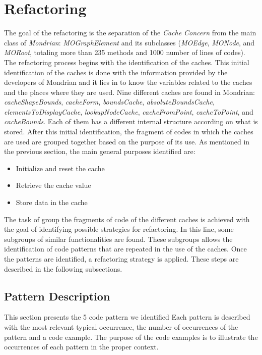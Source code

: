 \documentclass[preprint,10pt]{sigplanconf}
\newcommand{\seclabel}[1]{\label{sec:#1}}
\begin{document}
\section{Refactoring}\seclabel{refactoring}


The goal of the refactoring is the separation of the \emph{Cache
Concern} from the main class of \emph{Mondrian}: \emph{MOGraphElement}
and its subclasses (\emph{MOEdge}, \emph{MONode}, and \emph{MORoot}, totaling more than 235 methods and 1000 number of lines of codes).
The refactoring process begins with the identification of the caches.
This initial identification of the caches is done with the information
provided by the developers of Mondrian and it lies in to know the
variables related to the caches and the places where they are used.
Nine different caches are found in Mondrian: \emph{cacheShapeBounds},
\emph{cacheForm}, \emph{boundsCache}, \emph{absoluteBoundsCache},
\emph{elementsToDisplayCache}, \emph{lookupNodeCache}, \emph{cacheFromPoint},
\emph{cacheToPoint}, and \emph{cacheBounds}. Each of them has a different
internal structure according on what is stored. After this initial
identification, the fragment of codes in which the caches are used
are grouped together based on the purpose of its use. As mentioned
in the previous section, the main general purposes identified are: 
\begin{itemize}
\item Initialize and reset the cache
\item Retrieve the cache value
\item Store data in the cache
\end{itemize}
The task of group the fragments of code of the different caches is
achieved with the goal of identifying possible strategies for refactoring.
In this line, some subgroups of similar functionalities are found.
These subgroups allows the identification of code patterns that are
repeated in the use of the caches. Once the patterns are identified,
a refactoring strategy is applied. These steps are described in the
following subsections.


\subsection{Pattern Description\label{sub:Pattern-Identification}}

This section presents the 5 code pattern we identified 
Each pattern is described with the most relevant typical occurrence,
the number of occurrences of the pattern and a code example. The purpose
of the code examples is to illustrate the occurrences of each pattern
in the proper context.
\end{document}
